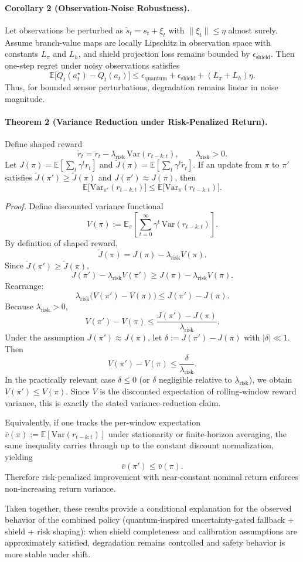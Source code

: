 \paragraph{Corollary 2 (Observation-Noise Robustness).}
Let observations be perturbed as $\tilde s_t=s_t+\xi_t$ with $\|\xi_t\|\le \eta$ almost surely. Assume branch-value maps are locally Lipschitz in observation space with constants $L_{\pi}$ and $L_h$, and shield projection loss remains bounded by $\epsilon_{\text{shield}}$. Then one-step regret under noisy observations satisfies
\[
\mathbb{E}\big[Q_t(a_t^{\star})-Q_t(a_t)\big]
\le
\epsilon_{\text{quantum}}+\epsilon_{\text{shield}}+(L_{\pi}+L_h)\eta.
\]
Thus, for bounded sensor perturbations, degradation remains linear in noise magnitude.

\paragraph{Theorem 2 (Variance Reduction under Risk-Penalized Return).}
Define shaped reward
\[
\tilde r_t=r_t-\lambda_{\mathrm{risk}}\,\mathrm{Var}(r_{t-k:t}), \qquad \lambda_{\mathrm{risk}}>0.
\]
Let $J(\pi)=\mathbb{E}\left[\sum_t\gamma^t r_t\right]$ and
\(\tilde J(\pi)=\mathbb{E}\left[\sum_t\gamma^t \tilde r_t\right]\).
If an update from $\pi$ to $\pi'$ satisfies $\tilde J(\pi')\ge \tilde J(\pi)$ and $J(\pi')\approx J(\pi)$, then
\[
\mathbb{E}\big[\mathrm{Var}_{\pi'}(r_{t-k:t})\big] \le
\mathbb{E}\big[\mathrm{Var}_{\pi}(r_{t-k:t})\big].
\]

\textit{Proof.}
Define discounted variance functional
\[
V(\pi):=\mathbb{E}_{\pi}\left[\sum_{t=0}^{\infty}\gamma^t\,\mathrm{Var}(r_{t-k:t})\right].
\]
By definition of shaped reward,
\[
\tilde J(\pi)=J(\pi)-\lambda_{\mathrm{risk}}V(\pi).
\]
Since $\tilde J(\pi')\ge \tilde J(\pi)$,
\[
J(\pi')-\lambda_{\mathrm{risk}}V(\pi')
\ge
J(\pi)-\lambda_{\mathrm{risk}}V(\pi).
\]
Rearrange:
\[
\lambda_{\mathrm{risk}}\big(V(\pi')-V(\pi)\big)
\le
J(\pi')-J(\pi).
\]
Because $\lambda_{\mathrm{risk}}>0$,
\[
V(\pi')-V(\pi)
\le
\frac{J(\pi')-J(\pi)}{\lambda_{\mathrm{risk}}}.
\]
Under the assumption $J(\pi')\approx J(\pi)$, let $\delta:=J(\pi')-J(\pi)$ with $|\delta|\ll 1$. Then
\[
V(\pi')-V(\pi)\le \frac{\delta}{\lambda_{\mathrm{risk}}}.
\]
In the practically relevant case $\delta\le 0$ (or $\delta$ negligible relative to $\lambda_{\mathrm{risk}}$), we obtain $V(\pi')\le V(\pi)$. Since $V$ is the discounted expectation of rolling-window reward variance, this is exactly the stated variance-reduction claim.

Equivalently, if one tracks the per-window expectation $\bar v(\pi):=\mathbb{E}[\mathrm{Var}(r_{t-k:t})]$ under stationarity or finite-horizon averaging, the same inequality carries through up to the constant discount normalization, yielding
\[
\bar v(\pi')\le \bar v(\pi).
\]
Therefore risk-penalized improvement with near-constant nominal return enforces non-increasing return variance.

Taken together, these results provide a conditional explanation for the observed behavior of the combined policy (quantum-inspired uncertainty-gated fallback + shield + risk shaping): when shield completeness and calibration assumptions are approximately satisfied, degradation remains controlled and safety behavior is more stable under shift.
